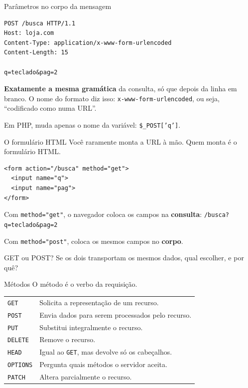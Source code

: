 \documentclass{beamer}
\begin{document}
\begin{frame}[fragile]{Parâmetros no corpo da mensagem}
  \begin{verbatim}
POST /busca HTTP/1.1
Host: loja.com
Content-Type: application/x-www-form-urlencoded
Content-Length: 15

q=teclado&pag=2
  \end{verbatim}

  \vspace{0.3cm}
  \textbf{Exatamente a mesma gramática} da consulta, só que depois da linha em
  branco. O nome do formato diz isso: \texttt{x-www-form-urlencoded}, ou seja,
  ``codificado como numa URL''.

  \vspace{0.2cm}
  Em PHP, muda apenas o nome da variável: \texttt{\$\_POST['q']}.
\end{frame}

\begin{frame}[fragile]{O formulário HTML}
  Você raramente monta a URL à mão. Quem monta é o formulário HTML.

  \begin{verbatim}
<form action="/busca" method="get">
  <input name="q">
  <input name="pag">
</form>
  \end{verbatim}

  \vspace{0.2cm}
  Com \texttt{method="get"}, o navegador coloca os campos na \textbf{consulta}:
  \texttt{/busca?q=teclado\&pag=2}

  \vspace{0.2cm}
  Com \texttt{method="post"}, coloca os mesmos campos no \textbf{corpo}.

  \vspace{0.4cm}
  \begin{alertblock}{GET ou POST?}
    Se os dois transportam os mesmos dados, qual escolher, e por quê?
  \end{alertblock}
\end{frame}

\begin{frame}{Métodos}
  O método é o verbo da requisição.

  \begin{center}
    \small
    \begin{tabular}{@{}lp{7cm}@{}}
      \toprule
      \texttt{GET}     & Solicita a representação de um recurso. \\
      \texttt{POST}    & Envia dados para serem processados pelo recurso. \\
      \texttt{PUT}     & Substitui integralmente o recurso. \\
      \texttt{DELETE}  & Remove o recurso. \\
      \texttt{HEAD}    & Igual ao \texttt{GET}, mas devolve só os cabeçalhos. \\
      \texttt{OPTIONS} & Pergunta quais métodos o servidor aceita. \\
      \texttt{PATCH}   & Altera parcialmente o recurso. \\
      \bottomrule
    \end{tabular}
  \end{center}
\end{frame}
\end{document}
